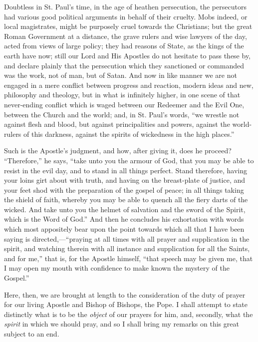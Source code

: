 Doubtless in St. Paul's time, in the age of heathen
persecution, the persecutors had various good political
arguments in behalf of their cruelty. Mobs indeed, or
local magistrates, might be purposely cruel towards the
Christians; but the great Roman Government at a distance,
the grave rulers and wise lawyers of the day, acted from
views of large policy; they had reasons of State, as the
kings of the earth have now; still our Lord and His
Apostles do not hesitate to pass these by, and declare
plainly that the persecution which they sanctioned or
commanded was the work, not of man, but of Satan. And now
in like manner we are not engaged in a mere conflict
between progress and reaction, modern ideas and new,
philosophy and theology, but in what is infinitely
higher, in one scene of that never-ending conflict which
is waged between our Redeemer and the Evil One, between
the Church and the world; and, in St. Paul's words,
``we wrestle not against flesh and blood, but against
principalities and powers, against the world-rulers of
this darkness, against the spirits of wickedness in the
high places.''

Such is the Apostle's judgment, and how, after giving
it, does he proceed? ``Therefore,'' he says,
``take unto you the armour of God, that you may be
able to resist in the evil day, and to stand in all
things perfect. Stand therefore, having your loins girt
about with truth, and having on the breast-plate of
justice, and your feet shod with the preparation of the
gospel of peace; in all things taking the shield of
faith, whereby you may be able to quench all the fiery
darts of the wicked. And take unto you the helmet of
salvation and the sword of the Spirit, which is the Word
of God.'' And then he concludes his exhortation with
words which most appositely bear upon the point towards
which all that I have been saying is
directed,—``praying at all times with all prayer
and supplication in the spirit, and watching therein with
all instance and supplication for all the Saints, and for
me,'' that is, for the Apostle himself, ``that
speech may be given me, that I may open my mouth with
confidence to make known the mystery of the Gospel.''

Here, then, we are brought at length to the
consideration of the duty of prayer for our living
Apostle and Bishop of Bishops, the Pope. I shall attempt
to state distinctly what is to be the \emph{object} of
our prayers for him, and, secondly, what the \emph{spirit}
in which we should pray, and so I shall bring my remarks
on this great subject to an end.

